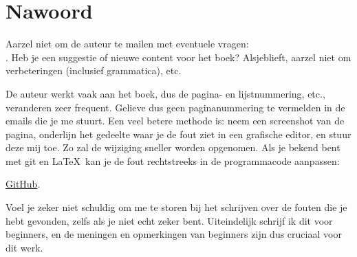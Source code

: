 \part*{Nawoord}

\mysection{\NLph{}}

Aarzel niet om de auteur te mailen met eventuele vragen: \\
\GTT{\EMAILS}.
Heb je een suggestie of nieuwe content voor het boek?
Alsjeblieft, aarzel niet om verbeteringen (inclusief grammatica), etc.

De auteur werkt vaak aan het boek, dus de pagina- en lijstnummering, etc., veranderen zeer frequent.
Gelieve dus geen paginanummering te vermelden in de emails die je me stuurt.
Een veel betere methode is: neem een screenshot van de pagina, onderlijn het gedeelte waar je de fout ziet in een grafische editor,
en stuur deze mij toe. Zo zal de wijziging sneller worden opgenomen.
Als je bekend bent met git en \LaTeX\, kan je de fout rechtstreeks in de programmacode aanpassen:

\href{http://go.yurichev.com/17089}{GitHub}.

Voel je zeker niet schuldig om me te storen bij het schrijven over de fouten die je hebt gevonden, zelfs als je niet echt zeker bent.
Uiteindelijk schrijf ik dit voor beginners, en de meningen en opmerkingen van beginners zijn dus cruciaal voor dit werk.

